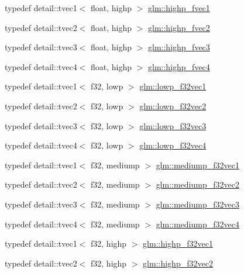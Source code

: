 \begin{CompactItemize}
\item 
typedef detail::tvec1$<$ float, highp $>$ \hyperlink{group__gtc__type__precision_g5d9f2208253856df60a57925f92ff0c8}{glm::highp\_\-fvec1}
\item 
typedef detail::tvec2$<$ float, highp $>$ \hyperlink{group__gtc__type__precision_gb58ecc53699d45f4f88d67bbff084c54}{glm::highp\_\-fvec2}
\item 
typedef detail::tvec3$<$ float, highp $>$ \hyperlink{group__gtc__type__precision_g79b821fc8ae989b12bb43e2cd3932580}{glm::highp\_\-fvec3}
\item 
typedef detail::tvec4$<$ float, highp $>$ \hyperlink{group__gtc__type__precision_ge0de2413648d89bf5a8e598e5520a439}{glm::highp\_\-fvec4}
\item 
typedef detail::tvec1$<$ f32, lowp $>$ \hyperlink{group__gtc__type__precision_ge802918ade0497b72c606430830f5ebb}{glm::lowp\_\-f32vec1}
\item 
typedef detail::tvec2$<$ f32, lowp $>$ \hyperlink{group__gtc__type__precision_g7faa2c9884c87b1e6512a966adad69e4}{glm::lowp\_\-f32vec2}
\item 
typedef detail::tvec3$<$ f32, lowp $>$ \hyperlink{group__gtc__type__precision_g1f878d91a5f5ab92c756244b62af7248}{glm::lowp\_\-f32vec3}
\item 
typedef detail::tvec4$<$ f32, lowp $>$ \hyperlink{group__gtc__type__precision_g59f7292d7ed0b7df72e6aa31010e2648}{glm::lowp\_\-f32vec4}
\item 
typedef detail::tvec1$<$ f32, mediump $>$ \hyperlink{group__gtc__type__precision_gf3d4077b241fbcab529fb0e0d88c0df6}{glm::mediump\_\-f32vec1}
\item 
typedef detail::tvec2$<$ f32, mediump $>$ \hyperlink{group__gtc__type__precision_gf53d380f948fdbb540eab960f2ad4b58}{glm::mediump\_\-f32vec2}
\item 
typedef detail::tvec3$<$ f32, mediump $>$ \hyperlink{group__gtc__type__precision_gda8879dd10f28428e2eb1ae62f643f65}{glm::mediump\_\-f32vec3}
\item 
typedef detail::tvec4$<$ f32, mediump $>$ \hyperlink{group__gtc__type__precision_ga5a1b058d185d87504591a11c6247518}{glm::mediump\_\-f32vec4}
\item 
typedef detail::tvec1$<$ f32, highp $>$ \hyperlink{group__gtc__type__precision_gc8be8ce31b9df0a5005d7c7458a3d03e}{glm::highp\_\-f32vec1}
\item 
typedef detail::tvec2$<$ f32, highp $>$ \hyperlink{group__gtc__type__precision_gbba3e1b3ae0bcaa7aaac573c08c2f8d3}{glm::highp\_\-f32vec2}
\item 

\end{CompactItemize}
